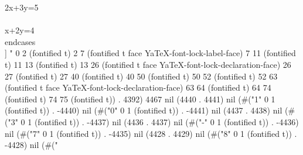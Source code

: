 		 2x+3y=5\\\\
		 x+2y=4
		\\end{cases}
	       \\]
" 0 2 (fontified t) 2 7 (fontified t face YaTeX-font-lock-label-face) 7 11 (fontified t) 11 13 (fontified t) 13 26 (fontified t face YaTeX-font-lock-declaration-face) 26 27 (fontified t) 27 40 (fontified t) 40 50 (fontified t) 50 52 (fontified t) 52 63 (fontified t face YaTeX-font-lock-declaration-face) 63 64 (fontified t) 64 74 (fontified t) 74 75 (fontified t)) . 4392) 4467 nil (4440 . 4441) nil (#("1" 0 1 (fontified t)) . -4440) nil (#("0" 0 1 (fontified t)) . -4441) nil (4437 . 4438) nil (#("3" 0 1 (fontified t)) . -4437) nil (4436 . 4437) nil (#("-" 0 1 (fontified t)) . -4436) nil (#("7" 0 1 (fontified t)) . -4435) nil (4428 . 4429) nil (#("8" 0 1 (fontified t)) . -4428) nil (#("
